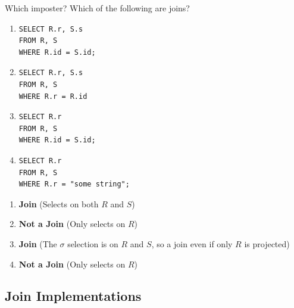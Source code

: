 \begin{examplebox}{Which imposter?}
    Which of the following are joins?
    \begin{multicols}{2}
        \begin{enumerate}
            \item {
                  \begin{verbatim}
SELECT R.r, S.s
FROM R, S
WHERE R.id = S.id;
\end{verbatim}
                  }
            \item {
                  \begin{verbatim}
SELECT R.r, S.s
FROM R, S
WHERE R.r = R.id
    \end{verbatim}
                  }
            \item {
                  \begin{verbatim}
SELECT R.r
FROM R, S
WHERE R.id = S.id;
        \end{verbatim}
                  }
            \item {
                  \begin{verbatim}
SELECT R.r
FROM R, S
WHERE R.r = "some string";
            \end{verbatim}
                  }
        \end{enumerate}
    \end{multicols}
    \tcblower
    \begin{enumerate}
        \item \textbf{Join} (Selects on both $R$ and $S$)
        \item \textbf{Not a Join} (Only selects on $R$)
        \item \textbf{Join} (The $\sigma$ selection is on $R$ and $S$, so a join even if only $R$ is projected)
        \item \textbf{Not a Join} (Only selects on $R$)
    \end{enumerate}
\end{examplebox}

\subsection{Join Implementations}
